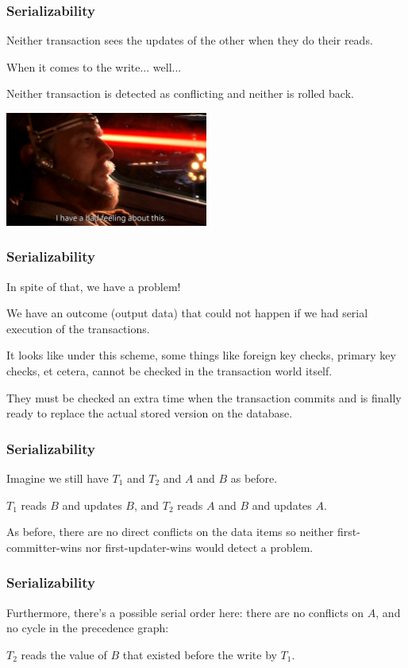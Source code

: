 \begin{frame}
\frametitle{Serializability}

Neither transaction sees the updates of the other when they do their reads. 

When it comes to the write... well... 

Neither transaction is detected as conflicting and neither is rolled back.

\begin{center}
	\includegraphics[width=0.5\textwidth]{images/badfeeling.jpg}
\end{center}

\end{frame}

\begin{frame}
\frametitle{Serializability}
In spite of that, we have a problem! 

We have an outcome (output data) that could not happen if we had serial execution of the transactions.

It looks like under this scheme, some things like foreign key checks, primary key checks, et cetera, cannot be checked in the transaction world itself.

They must be checked an extra time when the transaction commits and is finally ready to replace the actual stored version on the database.

\end{frame}

\begin{frame}
\frametitle{Serializability}
Imagine we still have $T_{1}$ and $T_{2}$ and $A$ and $B$ as before. 

$T_{1}$ reads $B$ and updates $B$, and $T_{2}$ reads $A$ and $B$ and updates $A$. 

As before, there are no direct conflicts on the data items so neither first-committer-wins nor first-updater-wins would detect a problem. 

\end{frame}

\begin{frame}
\frametitle{Serializability}

Furthermore, there's a possible serial order here: there are no conflicts on $A$, and no cycle in the precedence graph: 

$T_{2}$ reads the value of $B$ that existed before the write by $T_{1}$.

\end{frame}

